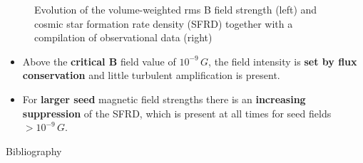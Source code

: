 \documentclass[10pt,aspectratio=169]{beamer}
\begin{document}
\begin{frame}
\begin{figure}
\begin{minipage}[b]{0.35\linewidth}
		\end{minipage}
		\caption{Evolution of the volume-weighted rms B field 
			strength (left) and cosmic star formation rate density (SFRD) 
			together with  a compilation of observational data (right)
		}
	\end{figure}
	\begin{itemize}
	\item<1|only@1> Above the \textbf{critical B} field value of $10^{-9}\,G$, the field intensity is \textbf{set by flux conservation} and little turbulent amplification is present.
	\item<2|only@2> For \textbf{larger seed} magnetic field strengths there is an \textbf{increasing suppression} of the SFRD, which is present at all times for seed 
	fields $>10^{-9}\,G$.
\end{itemize}
\end{frame}
\begin{frame}{Bibliography}
		
		
\end{frame}
\end{document}
